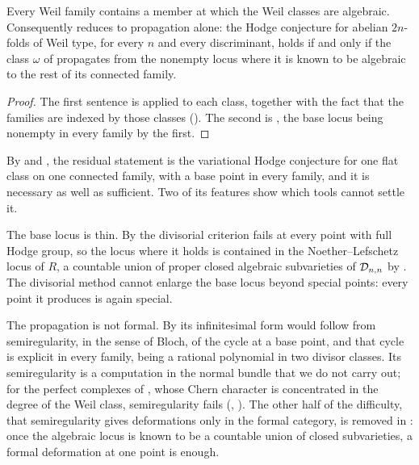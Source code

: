\begin{corollary}\label{cor:R2}
Every Weil family contains a member at which the Weil classes are algebraic.
Consequently  reduces to propagation alone: the Hodge
conjecture for abelian $2n$-folds of Weil type, for every $n$ and every
discriminant, holds if and only if the class $\omega$ of
 propagates from the nonempty locus where it is known to be
algebraic to the rest of its connected family.
\end{corollary}

\begin{proof}
The first sentence is  applied to each class, together
with the fact that the families are indexed by those classes
(). The second is , the base locus being
nonempty in every family by the first.
\end{proof}

\begin{remark}\label{rem:whatsleftnow}
By  and , the residual statement is the
variational Hodge conjecture for one flat class on one connected family, with
a base point in every family, and it is necessary as well as sufficient. Two
of its features show which tools cannot settle it.

The base locus is thin. By  the divisorial criterion fails
at every point with full Hodge group, so the locus where it holds is contained
in the Noether--Lefschetz locus of $R$, a countable union of proper closed
algebraic subvarieties of $\mathcal{D}_{n,n}$ by . The divisorial
method cannot enlarge the base locus beyond special points: every point it
produces is again special.

The propagation is not formal. By  its infinitesimal
form would follow from semiregularity, in the sense of Bloch, of the cycle at
a base point, and that cycle is explicit in every family, being a rational
polynomial in two divisor classes. Its semiregularity is a computation in the
normal bundle that we do not carry out; for the perfect complexes of
, whose Chern character is concentrated in the degree of
the Weil class, semiregularity fails (,
). The other half of the difficulty, that semiregularity
gives deformations only in the formal category, is removed in
: once the algebraic locus is known to be a countable
union of closed subvarieties, a formal deformation at one point is enough.
\end{remark}

